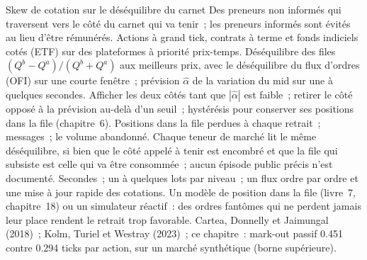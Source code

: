 \begin{strategyfile}{Skew de cotation sur le déséquilibre du carnet}\label{strat:hf:short-horizon-alpha:imbalance}
 Des preneurs non informés qui traversent vers le côté du carnet qui va tenir~; les preneurs informés sont évités au lieu
d'être rémunérés.
 Actions à grand tick, contrats à terme et fonds indiciels cotés (ETF) sur des plateformes à priorité prix-temps.
 Déséquilibre des files $(Q^b-Q^a)/(Q^b+Q^a)$ aux meilleurs prix, avec le déséquilibre du flux d'ordres (OFI) sur une courte fenêtre~; prévision $\hat\alpha$ de la
variation du mid sur une à quelques secondes.
 Afficher les deux côtés tant que $|\hat\alpha|$ est faible~; retirer le côté opposé à la prévision au-delà d'un seuil~; hystérésis pour
conserver ses positions dans la file (chapitre~6).
 Positions dans la file perdues à chaque retrait~; messages~; le volume abandonné.
 Chaque teneur de marché lit le même déséquilibre, si bien que le côté appelé à tenir est encombré et que la file qui subsiste est celle qui va
être consommée~; aucun épisode public précis n'est documenté.
 Secondes~; un à quelques lots par niveau~; un flux ordre par ordre et une mise à jour rapide des cotations.
 Un modèle de position dans la file (livre~7, chapitre~18) ou un simulateur réactif~: des ordres fantômes qui ne perdent jamais leur place
rendent le retrait trop favorable.
 Cartea, Donnelly et Jaimungal (2018)~; Kolm, Turiel et Westray (2023)~; ce chapitre~: mark-out passif 0.451 contre 0.294 ticks par
action, sur un marché synthétique (borne supérieure).
\end{strategyfile}

